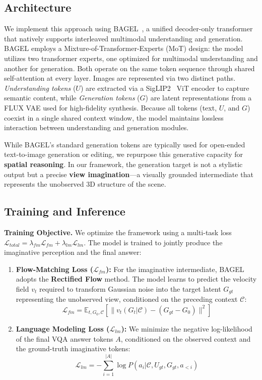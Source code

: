 \subsection{Architecture}
We implement this approach using BAGEL~\cite{deng2025bagel}, a unified decoder-only transformer that natively supports interleaved multimodal understanding and generation.
BAGEL employs a {Mixture-of-Transformer-Experts (MoT)} design: 
the model utilizes two transformer experts, one optimized for multimodal understanding and another for generation.
Both operate on the same token sequence through shared self-attention at every layer.
Images are represented via two distinct paths. \textit{Understanding tokens} ($U$) are extracted via a SigLIP2~\cite{tschannen2025siglip} ViT encoder to capture semantic content, while \textit{Generation tokens} ($G$) are latent representations from a FLUX VAE used for high-fidelity synthesis.
Because all tokens (text, $U$, and $G$) coexist in a single shared context window, the model maintains lossless interaction between understanding and generation modules.


While BAGEL's standard generation tokens are typically used for open-ended text-to-image generation or editing, we repurpose this generative capacity for \textbf{spatial reasoning}. In our framework, the generation target is not a stylistic output but a precise \textbf{view imagination}---a visually grounded intermediate that represents the unobserved 3D structure of the scene.



\subsection{Training and Inference}

\noindent\textbf{Training Objective.}
We optimize the framework using a multi-task loss $\mathcal{L}_{total} = \lambda_{fm} \mathcal{L}_{fm} + \lambda_{lm} \mathcal{L}_{lm}$. The model is trained to jointly produce the imaginative perception and the final answer:
\begin{enumerate}
    \item \textbf{Flow-Matching Loss ($\mathcal{L}_{fm}$):} For the imaginative intermediate, BAGEL adopts the \textbf{Rectified Flow} method. The model learns to predict the velocity field $v_t$ required to transform Gaussian noise into the target latent $G_{gt}$ representing the unobserved view, conditioned on the preceding context $\mathcal{C}$:
    \begin{equation}
        \mathcal{L}_{fm} = \mathbb{E}_{t, G_0, \mathcal{C}} \left[ \| v_t(G_t | \mathcal{C}) - (G_{gt} - G_0) \|^2 \right]
    \end{equation}
    \item \textbf{Language Modeling Loss ($\mathcal{L}_{lm}$):} We minimize the negative log-likelihood of the final VQA answer tokens $A$, conditioned on the observed context and the ground-truth imaginative tokens:
    \begin{equation}
        \mathcal{L}_{lm} = - \sum_{i=1}^{|A|} \log P(a_i | \mathcal{C}, U_{gt}, G_{gt}, a_{<i})
    \end{equation}
\end{enumerate}


